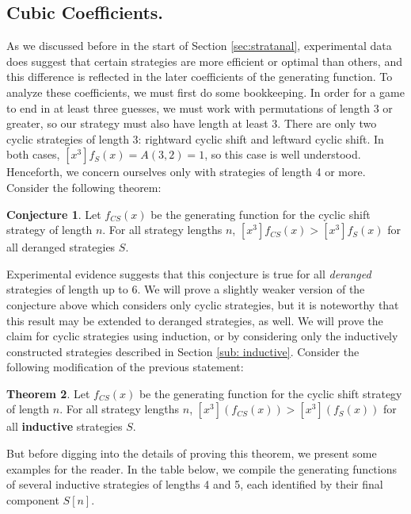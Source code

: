 \documentclass[article]{amsart}
\theoremstyle{definition}
\newtheorem{theorem}{Theorem}[section]
\newtheorem{conjecture}[theorem]{Conjecture}
\theoremstyle{definition}
\theoremstyle{remark}
\begin{document}
\subsection{Cubic Coefficients.} \label{sub:cubic}

As we discussed before in the start of Section \ref{sec:stratanal}, experimental data does suggest that certain strategies are more efficient or optimal than others, and this difference is reflected in the later coefficients of the generating function. To analyze these coefficients, we must first do some bookkeeping. In order for a game to end in at least three guesses, we must work with permutations of length 3 or greater, so our strategy must also have length at least 3. There are only two cyclic strategies of length 3: rightward cyclic shift and leftward cyclic shift. In both cases, $[x^3]f_S(x) = A(3,2) = 1$, so this case is well understood. Henceforth, we concern ourselves only with strategies of length 4 or more. Consider the following theorem:

\begin{conjecture} \label{conj:bestcubic}
    Let $f_{CS}(x)$ be the generating function for the cyclic shift strategy of length $n$. For all strategy lengths $n$, $[x^3]f_{CS}(x) > [x^3]f_{S}(x)$ for all deranged strategies $S$.
\end{conjecture} 

Experimental evidence suggests that this conjecture is true for all \textit{deranged} strategies of length up to 6. We will prove a slightly weaker version of the conjecture above which considers only cyclic strategies, but it is noteworthy that this result may be extended to deranged strategies, as well. We will prove the claim for cyclic strategies using induction, or by considering only the inductively constructed strategies described in Section \ref{sub: inductive}. Consider the following modification of the previous statement: 


\begin{theorem} \label{thm:indbestcubic}
    Let $f_{CS}(x)$ be the generating function for the cyclic shift strategy of length $n$. For all strategy lengths $n$, $[x^3](f_{CS}(x)) > [x^3](f_{S}(x))$ for all \textbf{inductive} strategies $S$.
\end{theorem}

But before digging into the details of proving this theorem, we present some examples for the reader. In the table below, we compile the generating functions of several inductive strategies of lengths 4 and 5, each identified by their final component $S[n]$.
\end{document}

